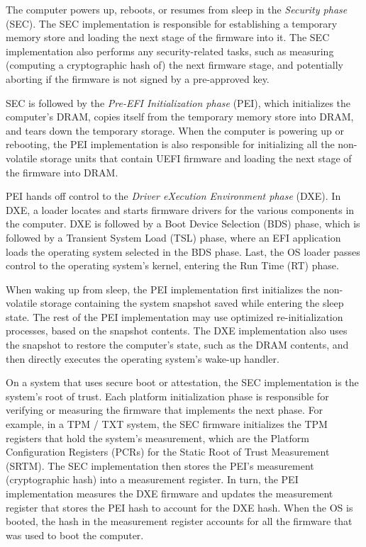 The computer powers up, reboots, or resumes from sleep in the
\textit{Security phase} (SEC). The SEC implementation is responsible for
establishing a temporary memory store and loading the next stage of the
firmware into it. The SEC implementation also performs any security-related
tasks, such as measuring (computing a cryptographic hash of) the next firmware
stage, and potentially aborting if the firmware is not signed by a pre-approved
key.

SEC is followed by the \textit{Pre-EFI Initialization phase} (PEI), which
initializes the computer's DRAM, copies itself from the temporary memory
store into DRAM, and tears down the temporary storage. When the computer is
powering up or rebooting, the PEI implementation is also responsible for
initializing all the non-volatile storage units that contain UEFI firmware and
loading the next stage of the firmware into DRAM.

PEI hands off control to the \textit{Driver eXecution Environment phase} (DXE).
In DXE, a loader locates and starts firmware drivers for the various components
in the computer. DXE is followed by a Boot Device Selection (BDS) phase, which
is followed by a Transient System Load (TSL) phase, where an EFI application
loads the operating system selected in the BDS phase. Last, the OS loader
passes control to the operating system's kernel, entering the Run Time (RT)
phase.

When waking up from sleep, the PEI implementation first initializes the
non-volatile storage containing the system snapshot saved while entering the
sleep state. The rest of the PEI implementation may use optimized
re-initialization processes, based on the snapshot contents. The DXE
implementation also uses the snapshot to restore the computer's state, such as
the DRAM contents, and then directly executes the operating system's wake-up
handler.


On a system that uses secure boot or attestation, the SEC implementation is the
system's root of trust. Each platform initialization phase is responsible for
verifying or measuring the firmware that implements the next phase. For
example, in a TPM / TXT system, the SEC firmware initializes the TPM registers
that hold the system's measurement, which are the Platform Configuration
Registers (PCRs) for the Static Root of Trust Measurement (SRTM). The SEC
implementation then stores the PEI's measurement (cryptographic hash) into a
measurement register. In turn, the PEI implementation measures the DXE firmware
and updates the measurement register that stores the PEI hash to account for
the DXE hash.  When the OS is booted, the hash in the measurement register
accounts for all the firmware that was used to boot the computer.


